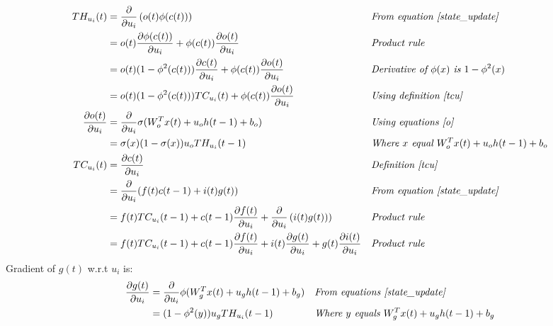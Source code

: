 \documentclass{article}
\begin{document}
\begin{align*}
TH_{u_i}(t) & = \frac{\partial}{\partial u_i} \left ( o(t) \phi(c(t)) \right ) && \textit{From equation \ref{state_update}} \\
& = o(t) \frac{\partial \phi(c(t))}{\partial u_i}  + \phi(c(t)) \frac{\partial o(t)}{\partial u_i}   && \textit{Product rule} \\
&= o(t) (1-\phi^{2}(c(t))) \frac{\partial c(t)}{\partial u_i}  + \phi(c(t)) \frac{\partial o(t)}{\partial u_i}   && \textit{Derivative of $\phi(x)$ is $1-\phi^2(x)$} \\
&= o(t) (1-\phi^{2}(c(t))) TC_{u_{i}}(t)  + \phi(c(t)) \frac{\partial o(t)}{\partial u_i}   && \textit{Using definition \ref{tcu}} \\
\frac{\partial o(t)}{\partial u_i} &=  \frac{\partial}{\partial u_i} \sigma(W_{o}^T x(t) + u_{o} h(t-1) + b_o) && \textit{Using equations \ref{o}}\\
&= \sigma(x)(1-\sigma(x))u_o TH_{u_i}(t-1) && \textit{Where $x$ equal $W_{o}^T x(t) + u_{o} h(t-1) + b_o$} \\
TC_{u_i}(t) &=  \frac{\partial c(t)}{\partial u_i} && \textit{Definition \ref{tcu}} \\ 
&=  \frac{\partial}{\partial u_i} (f(t)  c(t-1) + i(t) g(t))  && \textit{From equation \ref{state_update}} \\
&= f(t) TC_{u_i}(t-1) + c(t-1)\frac{\partial f(t)}{ \partial u_i} + \frac{\partial}{\partial u_i} \left ( i(t) g(t) ) \right )  && \textit{Product rule}\\
&= f(t) TC_{u_i}(t-1) + c(t-1)\frac{\partial f(t)}{ \partial u_i} + i(t)\frac{\partial g(t) }{\partial u_i}  + g(t)\frac{\partial i(t) }{\partial u_i}  && \textit{Product rule} 
\end{align*}
Gradient of  $g(t)$  w.r.t  $u_i$ is:
\begin{align*}
\frac{\partial g(t)}{\partial u_i} &=  \frac{\partial}{\partial u_i} \phi(W_{g}^T x(t) + u_{g} h(t-1) + b_g) && \textit{From equations \ref{state_update}} \\
&= (1-\phi^2(y))u_g TH_{u_i}(t-1) && \textit{Where $y$ equals $W_{g}^T x(t) + u_{g} h(t-1) + b_g$} \\
\end{align*}
\end{document}
